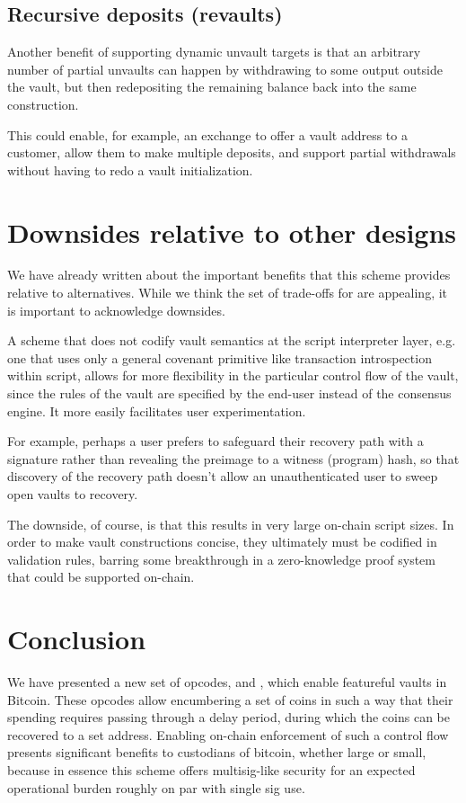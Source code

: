 \documentclass[10pt]{article}
\begin{document}
\subsection*{Recursive deposits (revaults)}

Another benefit of supporting dynamic unvault targets is that an arbitrary number of
partial unvaults can happen by withdrawing to some output outside the vault, but then
redepositing the remaining balance back into the same  
construction.

This could enable, for example, an exchange to offer a vault address to a customer,
allow them to make multiple deposits, and support partial withdrawals without having to
redo a vault initialization.

\section*{Downsides relative to other designs}

We have already written about the important benefits that this scheme provides relative
to alternatives. While we think the set of trade-offs for \opv{} are
appealing, it is important to acknowledge downsides.

A scheme that does not codify vault semantics at the script interpreter layer, e.g. one
that uses only a general covenant primitive like transaction introspection within
script, allows for more flexibility in the particular control flow of the vault, since
the rules of the vault are specified by the end-user instead of the consensus engine.
It more easily facilitates user experimentation.

For example, perhaps a user prefers to safeguard their recovery path with a signature
rather than revealing the preimage to a witness (program) hash, so that discovery of
the recovery path doesn't allow an unauthenticated user to sweep open vaults to
recovery.

The downside, of course, is that this results in very large on-chain script sizes. In
order to make vault constructions concise, they ultimately must be codified in
validation rules, barring some breakthrough in a zero-knowledge proof system that could
be supported on-chain.

\section*{Conclusion}

We have presented a new set of opcodes, \opv{} and \opuv{}, which enable featureful
vaults in Bitcoin. These opcodes allow encumbering a set of coins in such a way that
their spending requires passing through a delay period, during which the coins can be
recovered to a set address. Enabling on-chain enforcement of such a control flow
presents significant benefits to custodians of bitcoin, whether large or small, because
in essence this scheme offers multisig-like security for an expected operational burden roughly
on par with single sig use.
\end{document}

